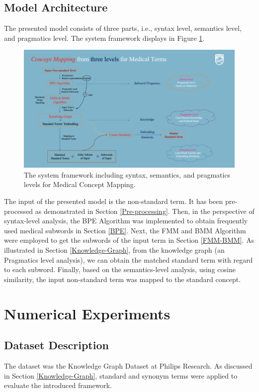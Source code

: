 \documentclass{article}
\newcommand{\reffig}[1]{Figure \ref{#1}}
\newcommand{\refsec}[1]{Section \ref{#1}}
\begin{document}
\subsection{Model Architecture}
The presented model consists of three parts, i.e., syntax level, semantics level, and pragmatics level. The system framework displays in \reffig{method}.


\begin{figure}[h]
	\centering
	\includegraphics[width=\linewidth]{method.png}
	\caption{The system framework including syntax, semantics, and pragmatics levels for Medical Concept Mapping.}
	\label{method}
\end{figure}

The input of the presented model is the non-standard term. It has been pre-processed as demonstrated in \refsec{Pre-processing}. Then, in the perspective of syntax-level analysis, the BPE Algorithm was implemented to obtain frequently used medical subwords in \refsec{BPE}. Next, the FMM and BMM Algorithm were employed to get the subwords of the input term in \refsec{FMM-BMM}. As illustrated in \refsec{Knowledge-Graph}, from the knowledge graph (an Pragmatics level analysis), we can obtain the matched standard term with regard to each subword. Finally, based on the semantics-level analysis, using cosine similarity, the input non-standard term was mapped to the standard concept.

\section{Numerical Experiments}
\subsection{Dataset Description}
The dataset was the Knowledge Graph Dataset at Philips Research. As discussed in \refsec{Knowledge-Graph}, standard and synonym terms were applied to evaluate the introduced framework.
\end{document}
